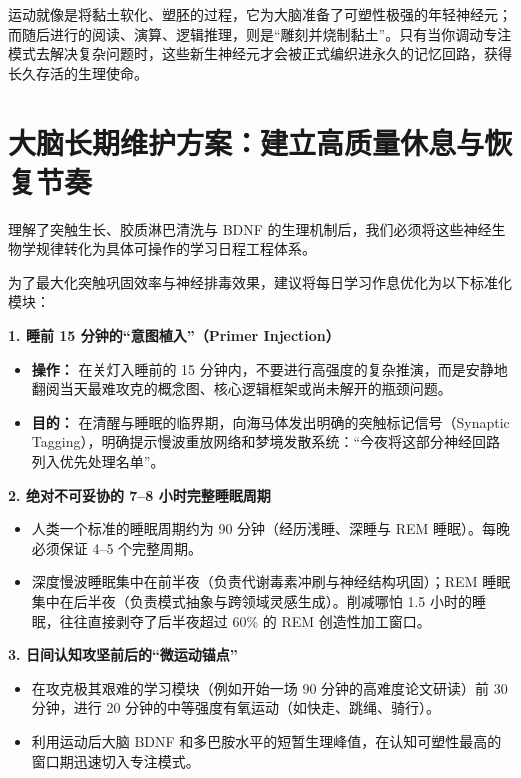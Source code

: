 \documentclass[12pt,a4paper,openany]{ctexbook}
\begin{document}
运动就像是将黏土软化、塑胚的过程，它为大脑准备了可塑性极强的年轻神经元；而随后进行的阅读、演算、逻辑推理，则是“雕刻并烧制黏土”。只有当你调动专注模式去解决复杂问题时，这些新生神经元才会被正式编织进永久的记忆回路，获得长久存活的生理使命。

\section{大脑长期维护方案：建立高质量休息与恢复节奏}

理解了突触生长、胶质淋巴清洗与 BDNF 的生理机制后，我们必须将这些神经生物学规律转化为具体可操作的学习日程工程体系。

\begin{practicebox}[神经友好型学习与作息执行协议]
为了最大化突触巩固效率与神经排毒效果，建议将每日学习作息优化为以下标准化模块：

\textbf{1. 睡前 15 分钟的“意图植入”（Primer Injection）}
\begin{itemize}
    \item \textbf{操作：} 在关灯入睡前的 15 分钟内，不要进行高强度的复杂推演，而是安静地翻阅当天最难攻克的概念图、核心逻辑框架或尚未解开的瓶颈问题。
    \item \textbf{目的：} 在清醒与睡眠的临界期，向海马体发出明确的突触标记信号（Synaptic Tagging），明确提示慢波重放网络和梦境发散系统：“今夜将这部分神经回路列入优先处理名单”。
\end{itemize}

\textbf{2. 绝对不可妥协的 7--8 小时完整睡眠周期}
\begin{itemize}
    \item 人类一个标准的睡眠周期约为 90 分钟（经历浅睡、深睡与 REM 睡眠）。每晚必须保证 4--5 个完整周期。
    \item 深度慢波睡眠集中在前半夜（负责代谢毒素冲刷与神经结构巩固）；REM 睡眠集中在后半夜（负责模式抽象与跨领域灵感生成）。削减哪怕 1.5 小时的睡眠，往往直接剥夺了后半夜超过 60\% 的 REM 创造性加工窗口。
\end{itemize}

\textbf{3. 日间认知攻坚前后的“微运动锚点”}
\begin{itemize}
    \item 在攻克极其艰难的学习模块（例如开始一场 90 分钟的高难度论文研读）前 30 分钟，进行 20 分钟的中等强度有氧运动（如快走、跳绳、骑行）。
    \item 利用运动后大脑 BDNF 和多巴胺水平的短暂生理峰值，在认知可塑性最高的窗口期迅速切入专注模式。
\end{itemize}
\end{practicebox}
\end{document}
